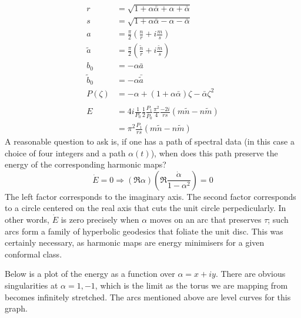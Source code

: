 \begin{align*}
r &= \sqrt{ 1 + \alpha\bar \alpha + \alpha + \bar \alpha} \\
s &= \sqrt{ 1 + \alpha\bar \alpha - \alpha - \bar \alpha} \\
a &= \frac{\pi}{2}\left( \frac{n}{r} + i\frac{m}{s} \right) \\
\tilde a &= \frac{\pi}{2}\left( \frac{\tilde n}{r} + i\frac{\tilde m}{s} \right)\\
b_0 &= - \alpha \bar a \\
\tilde b_0 &= - \alpha \bar{\tilde a} \\
P(\zeta) &= -\alpha + (1+\alpha\bar \alpha)\zeta - \bar \alpha\zeta^2 \\
& \\
E &= 4i \frac{1}{P_0}\frac{1}{2}\frac{P_1}{\overline P_0}\frac{\pi^2}{4}\frac{-2i}{rs}(m\tilde n - n\tilde m) \\
&= \pi^2\frac{P_1}{rs}(m\tilde n - n\tilde m)
\end{align*}
A reasonable question to ask is, if one has a path of spectral data (in this case a choice of four integers and a path $\alpha(t)$), when does this path preserve the energy of the corresponding harmonic maps?
\[
\dot E = 0 \Rightarrow \left(\Re \alpha\right)\left( \Re \frac{\dot \alpha}{1-\alpha^2} \right) = 0
\]
The left factor corresponds to the imaginary axis. The second factor corresponds to a circle centered on the real axis that cuts the unit circle perpedicularly. In other words, $\dot E$ is zero precisely when $\alpha$ moves on an arc that preserves $\tau$; such arcs form a family of hyperbolic geodesics that foliate the unit disc. This was certainly necessary, as harmonic maps are energy minimisers for a given conformal class.

Below is a plot of the energy as a function over $\alpha = x + i y$. There are obvious singularities at $\alpha=1,-1$, which is the limit as the torus we are mapping from becomes infinitely stretched. The arcs mentioned above are level curves for this graph.

\begin{center}
\end{center}
